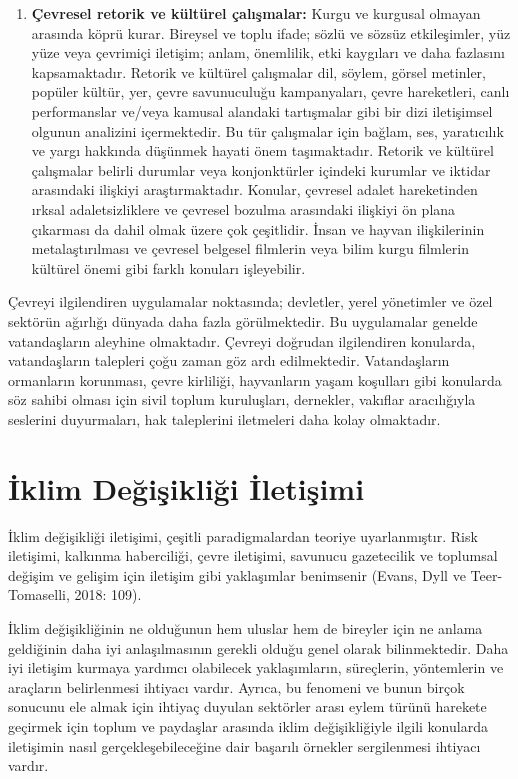 \documentclass[
]{book}
\begin{document}
\begin{enumerate}
\item
  \textbf{Çevresel retorik ve kültürel çalışmalar:} Kurgu ve kurgusal olmayan arasında köprü kurar. Bireysel ve toplu ifade; sözlü ve sözsüz etkileşimler, yüz yüze veya çevrimiçi iletişim; anlam, önemlilik, etki kaygıları ve daha fazlasını kapsamaktadır. Retorik ve kültürel çalışmalar dil, söylem, görsel metinler, popüler kültür, yer, çevre savunuculuğu kampanyaları, çevre hareketleri, canlı performanslar ve/veya kamusal alandaki tartışmalar gibi bir dizi iletişimsel olgunun analizini içermektedir. Bu tür çalışmalar için bağlam, ses, yaratıcılık ve yargı hakkında düşünmek hayati önem taşımaktadır. Retorik ve kültürel çalışmalar belirli durumlar veya konjonktürler içindeki kurumlar ve iktidar arasındaki ilişkiyi araştırmaktadır. Konular, çevresel adalet hareketinden ırksal adaletsizliklere ve çevresel bozulma arasındaki ilişkiyi ön plana çıkarması da dahil olmak üzere çok çeşitlidir. İnsan ve hayvan ilişkilerinin metalaştırılması ve çevresel belgesel filmlerin veya bilim kurgu filmlerin kültürel önemi gibi farklı konuları işleyebilir.
\end{enumerate}

Çevreyi ilgilendiren uygulamalar noktasında; devletler, yerel yönetimler ve özel sektörün ağırlığı dünyada daha fazla görülmektedir. Bu uygulamalar genelde vatandaşların aleyhine olmaktadır. Çevreyi doğrudan ilgilendiren konularda, vatandaşların talepleri çoğu zaman göz ardı edilmektedir. Vatandaşların ormanların korunması, çevre kirliliği, hayvanların yaşam koşulları gibi konularda söz sahibi olması için sivil toplum kuruluşları, dernekler, vakıflar aracılığıyla seslerini duyurmaları, hak taleplerini iletmeleri daha kolay olmaktadır.

\hypertarget{iklim-deux11fiux15fikliux11fi-iletiux15fimi}{%
\section{İklim Değişikliği İletişimi}\label{iklim-deux11fiux15fikliux11fi-iletiux15fimi}}

İklim değişikliği iletişimi, çeşitli paradigmalardan teoriye uyarlanmıştır. Risk iletişimi, kalkınma haberciliği, çevre iletişimi, savunucu gazetecilik ve toplumsal değişim ve gelişim için iletişim gibi yaklaşımlar benimsenir (Evans, Dyll ve Teer-Tomaselli, 2018: 109).

İklim değişikliğinin ne olduğunun hem uluslar hem de bireyler için ne anlama geldiğinin daha iyi anlaşılmasının gerekli olduğu genel olarak bilinmektedir. Daha iyi iletişim kurmaya yardımcı olabilecek yaklaşımların, süreçlerin, yöntemlerin ve araçların belirlenmesi ihtiyacı vardır. Ayrıca, bu fenomeni ve bunun birçok sonucunu ele almak için ihtiyaç duyulan sektörler arası eylem türünü harekete geçirmek için toplum ve paydaşlar arasında iklim değişikliğiyle ilgili konularda iletişimin nasıl gerçekleşebileceğine dair başarılı örnekler sergilenmesi ihtiyacı vardır.
\end{document}
